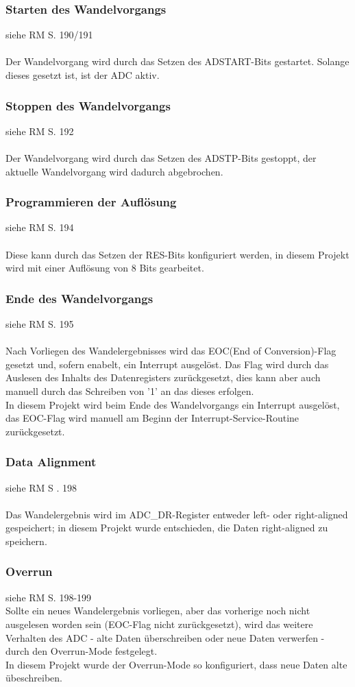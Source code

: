 \documentclass[11pt]{report}
\begin{document}
			\subsubsection{Starten des Wandelvorgangs}
				siehe RM S. 190/191\\
				\\Der Wandelvorgang wird durch das Setzen des ADSTART-Bits gestartet. Solange dieses gesetzt ist, ist der ADC aktiv.
			\subsubsection{Stoppen des Wandelvorgangs}
				siehe RM S. 192\\
				\\Der Wandelvorgang wird durch das Setzen des ADSTP-Bits gestoppt, der aktuelle Wandelvorgang wird dadurch abgebrochen.
			\subsubsection{Programmieren der Auflösung}
				siehe RM S. 194\\
				\\Diese kann durch das Setzen der RES-Bits konfiguriert werden, in diesem Projekt wird mit einer Auflösung von 8 Bits gearbeitet.
			\subsubsection{Ende des Wandelvorgangs}
				siehe RM S. 195\\
				\\Nach Vorliegen des Wandelergebnisses wird das EOC(End of Conversion)-Flag gesetzt und, sofern enabelt, ein Interrupt ausgelöst. Das Flag wird durch das Auslesen des Inhalts des Datenregisters zurückgesetzt, dies kann aber auch manuell durch das Schreiben von '1' an das dieses erfolgen.\\
				In diesem Projekt wird beim Ende des Wandelvorgangs ein Interrupt ausgelöst, das EOC-Flag wird manuell am Beginn der Interrupt-Service-Routine zurückgesetzt.
			\subsubsection{Data Alignment}
				siehe RM S . 198\\
				\\Das Wandelergebnis wird im ADC\_DR-Register entweder left- oder right-aligned gespeichert; in diesem Projekt wurde entschieden, die Daten right-aligned zu speichern.
			\subsubsection{Overrun}
				siehe RM S. 198-199\\
				Sollte ein neues Wandelergebnis vorliegen, aber das vorherige noch nicht ausgelesen worden sein (EOC-Flag nicht zurückgesetzt), wird das weitere Verhalten des ADC  - alte Daten überschreiben oder neue Daten verwerfen - durch den Overrun-Mode festgelegt.\\
				In diesem Projekt wurde der Overrun-Mode so konfiguriert, dass neue Daten alte übeschreiben.
\end{document}
